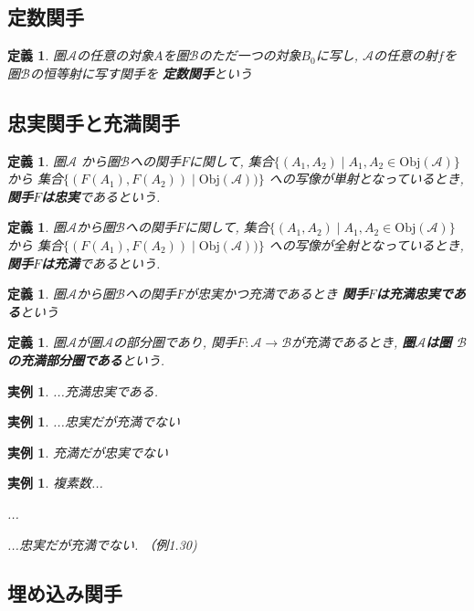 \documentclass[dvipdfmx]{jsbook}
\theoremstyle{plain}
\newtheorem{Def}[thm]{定義}
\newtheorem{example}[thm]{実例}
\begin{document}
\subsection{定数関手}
\begin{Def}
圏$\mathscr{A}$の任意の対象$A$を圏$\mathscr{B}$のただ一つの対象$B_0$に写し,
$\mathscr{A}$の任意の射$f$を圏$\mathscr{B}$の恒等射に写す関手を
{\bf 定数関手}という
\end{Def}

\subsection{忠実関手と充満関手}
\begin{Def}
圏$\mathscr{A}$
から圏$\mathscr{B}$への関手$F$に関して,
集合$\{(A_1,A_2)\mid A_1,A_2\in\mathrm{Obj}(\mathscr{A})\}$
から
集合$\{(F(A_1),F(A_2))\mid\mathrm{Obj}(\mathscr{A}))\}$
への写像が単射となっているとき,
{\bf 関手$F$は忠実}であるという.
\end{Def}
\begin{Def}
圏$\mathscr{A}$から圏$\mathscr{B}$への関手$F$に関して,
集合$\{(A_1,A_2)\mid A_1,A_2\in\mathrm{Obj}(\mathscr{A})\}$
から
集合$\{(F(A_1),F(A_2))\mid\mathrm{Obj}(\mathscr{A}))\}$
への写像が全射となっているとき,
{\bf 関手$F$は充満}であるという.
\end{Def}
\begin{Def}圏$\mathscr{A}$から圏$\mathscr{B}$への関手$F$が忠実かつ充満であるとき
{\bf 関手$F$は充満忠実である}という
\end{Def}
\begin{Def}
圏$\mathscr{A}$が圏$\mathscr{A}$の部分圏であり, 関手$F:\mathscr{A}\rightarrow\mathscr{B}$が充満であるとき,
{\bf 圏$\mathscr{A}$は圏 $\mathscr{B}$の充満部分圏である}という.
\end{Def}
\begin{example}
...充満忠実である.
\end{example}
\begin{example}
...忠実だが充満でない
\end{example}
\begin{example}
充満だが忠実でない
\end{example}
\begin{example}
複素数...

...

...忠実だが充満でない. （例1.30)
\end{example}
\subsection{埋め込み関手}
\end{document}
